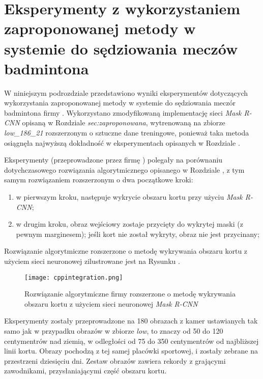 \section{Eksperymenty z wykorzystaniem zaproponowanej metody w systemie do sędziowania meczów badmintona}
\label{sec:integrationblue}

W niniejszym podrozdziale przedstawiono wyniki eksperymentów dotyczących wykorzystania zaproponowanej metody w systemie do sędziowania meczór badmintona firmy \blue{}.
Wykorzystano zmodyfikowaną implementację sieci \textit{Mask R-CNN} opisaną w Rozdziale \textit{sec:zaproponowana}, wytrenowaną na zbiorze \textit{low\_186\_21} rozszerzonym o sztuczne dane treningowe, ponieważ taka metoda osiągnęła najwyższą dokładność w eksperymentach opisanych w Rozdziale .

Eksperymenty (przeprowadzone przez firmę \blue{}) polegały na porównaniu dotychczasowego rozwiązania algorytmicznego opisanego w Rozdziale , z tym samym rozwiązaniem rozszerzonym o dwa początkowe kroki:

\begin{enumerate}
  \item w pierwszym kroku, następuje wykrycie obszaru kortu przy użyciu \textit{Mask R-CNN};
  \item w drugim kroku, obraz wejściowy zostaje przycięty do wykrytej maski (z pewnym marginesem); jeśli kort nie został wykryty, obraz nie jest przycinany;
\end{enumerate}

Rozwiązanie algorytmiczne rozszerzone o metodę wykrywania obszaru kortu z użyciem sieci neuronowej zilustrowane jest na Rysunku .

\begin{figure}[h]
  \centering
  \texttt{[image: cppintegration.png]}
  \caption{Rozwiązanie algorytmiczne firmy \blue{} rozszerzone o metodę wykrywania obszaru kortu z użyciem sieci neuronowej \textit{Mask R-CNN}}
  \label{fig:cppintegration}
\end{figure}

Eksperymenty zostały przeprowadzone na 180 obrazach z kamer ustawianych tak samo jak w przypadku obrazów w zbiorze \textit{low}, to znaczy od 50 do 120 centymentrów nad ziemią, w odległości od 75 do 350 centymentrów od najbliższej linii kortu. Obrazy pochodzą z tej samej placówki sportowej, i zostały zebrane na przestrzeni dziesięciu dni. Zestaw obrazów zawiera rekordy z grającymi zawodnikami, przysłaniającymi część obszaru kortu.

